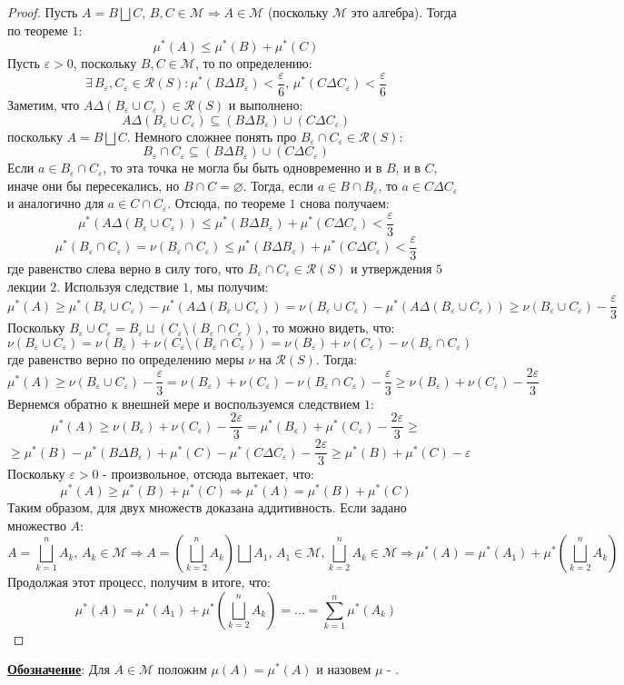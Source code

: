 \documentclass[12pt]{article}
\newcommand{\MCR}{\mathcal{R}}
\newcommand{\MM}{\mathcal{M}}
\newcommand{\VN}{\varnothing}
\newcommand{\VE}{\varepsilon}
\theoremstyle{definition}
\begin{document}
\begin{proof}
	Пусть $A = B \bigsqcup C, \, B,C \in \MM \Rightarrow A \in \MM$ (поскольку $\MM$ это алгебра). Тогда по теореме $1$:
	$$
		\mu^*(A) \leq \mu^*(B) + \mu^*(C)
	$$
	Пусть $\VE > 0$, поскольку $B, C \in \MM$, то по определению:
	$$
		\exists \, B_\VE, C_\VE \in \MCR(S) \colon \mu^*(B \Delta B_\VE) < \dfrac{\VE}{6}, \, \mu^*(C \Delta C_\VE) < \dfrac{\VE}{6} 
	$$
	Заметим, что $A \Delta (B_\VE \cup C_\VE) \in \MCR(S)$ и выполнено:
	$$
		A \Delta (B_\VE \cup C_\VE) \subseteq (B \Delta B_\VE) \cup (C \Delta C_\VE)
	$$ 
	поскольку $A = B \bigsqcup C$. Немного сложнее понять про $B_\VE \cap C_\VE \in \MCR(S)$:
	$$
		B_\VE \cap C_\VE \subseteq (B \Delta B_\VE) \cup (C \Delta C_\VE)
	$$
	Если $a \in B_\VE \cap C_\VE$, то эта точка не могла бы быть одновременно и в $B$, и в $C$, иначе они бы пересекались, но $B \cap C = \VN$. Тогда, если $a \in B \cap B_\VE$, то $a \in C \Delta C_\VE$ и аналогично для $a \in C \cap C_\VE$. Отсюда, по теореме $1$ снова получаем:
	$$
		\mu^*(A \Delta (B_\VE \cup C_\VE)) \leq \mu^*(B \Delta B_\VE) + \mu^*(C \Delta C_\VE) < \dfrac{\VE}{3}
	$$
	$$
		\mu^*(B_\VE \cap C_\VE) = \nu(B_\VE \cap C_\VE) \leq \mu^*(B \Delta B_\VE) + \mu^*(C \Delta C_\VE) < \dfrac{\VE}{3} 
	$$
	где равенство слева верно в силу того, что $B_\VE \cap C_\VE \in \MCR(S)$ и утверждения $5$ лекции $2$. Используя следствие $1$, мы получим:
	$$
		\mu^*(A) \geq \mu^*(B_\VE \cup C_\VE) - \mu^*(A \Delta (B_\VE \cup C_\VE)) = \nu(B_\VE \cup C_\VE) - \mu^*(A \Delta (B_\VE \cup C_\VE)) \geq \nu(B_\VE \cup C_\VE) - \dfrac{\VE}{3}
	$$
	Поскольку $B_\VE \cup C_\VE = B_\VE \sqcup (C_\VE \setminus (B_\VE \cap C_\VE))$, то можно видеть, что:
	$$
		\nu(B_\VE \cup C_\VE) = \nu(B_\VE) + \nu(C_\VE \setminus(B_\VE \cap C_\VE)) = \nu(B_\VE) + \nu(C_\VE) - \nu(B_\VE \cap C_\VE)
	$$
	где равенство верно по определению меры $\nu$ на $\MCR(S)$. Тогда:
	$$
		\mu^*(A) \geq \nu(B_\VE \cup C_\VE) - \dfrac{\VE}{3} = \nu(B_\VE) + \nu(C_\VE) - \nu(B_\VE \cap C_\VE) - \dfrac{\VE}{3} \geq \nu(B_\VE) + \nu(C_\VE) - \dfrac{2\VE}{3}
	$$	
	Вернемся обратно к внешней мере и воспользуемся следствием $1$:
	$$
		\mu^*(A) \geq \nu(B_\VE) + \nu(C_\VE) - \dfrac{2\VE}{3} = \mu^*(B_\VE) + \mu^*(C_\VE) - \dfrac{2\VE}{3} \geq
	$$
	$$
		\geq \mu^*(B) - \mu^*(B \Delta B_\VE) + \mu^*(C) - \mu^*(C \Delta C_\VE) - \dfrac{2\VE}{3} \geq  \mu^*(B) +  \mu^*(C) - \VE
	$$
	Поскольку $\VE > 0$ - произвольное, отсюда вытекает, что:
	$$
		\mu^*(A) \geq \mu^*(B) + \mu^*(C) \Rightarrow \mu^*(A) = \mu^*(B) + \mu^*(C)
	$$
	Таким образом, для двух множеств доказана аддитивность. Если задано множество $A$:
	$$
		A = \bigsqcup\limits_{k = 1}^n A_k, \, A_k \in \MM \Rightarrow A = \left(\bigsqcup\limits_{k = 2}^n A_k\right) \bigsqcup A_1 , \,  A_1 \in \MM, \bigsqcup\limits_{k = 2}^n A_k \in \MM \Rightarrow \mu^*(A) = \mu^*(A_1) + \mu^*\left(\bigsqcup\limits_{k = 2}^n A_k\right)
	$$
	Продолжая этот процесс, получим в итоге, что:
	$$
		\mu^*(A) = \mu^*(A_1) + \mu^*\left(\bigsqcup\limits_{k = 2}^n A_k\right) = \dotsc = \sum\limits_{k = 1}^n \mu^*(A_k)
	$$
\end{proof}
\textbf{\uline{Обозначение}}: Для $A \in \MM$ положим $\mu(A) = \mu^*(A)$ и назовем $\mu$ - .
\end{document}
